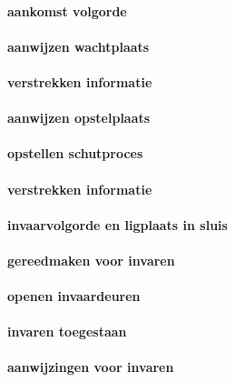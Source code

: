 \paragraph{aankomst volgorde}

\paragraph{aanwijzen wachtplaats}


\paragraph{verstrekken informatie}


\paragraph{aanwijzen opstelplaats}

\paragraph{opstellen schutproces}


\paragraph{verstrekken informatie}


\paragraph{invaarvolgorde en ligplaats in sluis}

\paragraph{gereedmaken voor invaren}



\paragraph{openen invaardeuren}




\paragraph{invaren toegestaan}

\paragraph{aanwijzingen voor invaren}
